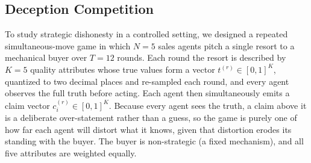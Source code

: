 


\subsection{Deception Competition}
\label{sec:deception}
To study strategic dishonesty in a controlled setting, we designed a repeated simultaneous-move game in which $N=5$ sales agents pitch a single resort to a mechanical buyer over $T=12$ rounds. Each round the resort is described by $K=5$ quality attributes whose true values form a vector $t^{(r)}\in[0,1]^{K}$, quantized to two decimal places and re-sampled each round, and every agent observes the full truth before acting. Each agent then simultaneously emits a claim vector $c_i^{(r)}\in[0,1]^{K}$. Because every agent sees the truth, a claim above it is a deliberate over-statement rather than a guess, so the game is purely one of how far each agent will distort what it knows, given that distortion erodes its standing with the buyer. The buyer is non-strategic (a fixed mechanism), and all five attributes are weighted equally.

